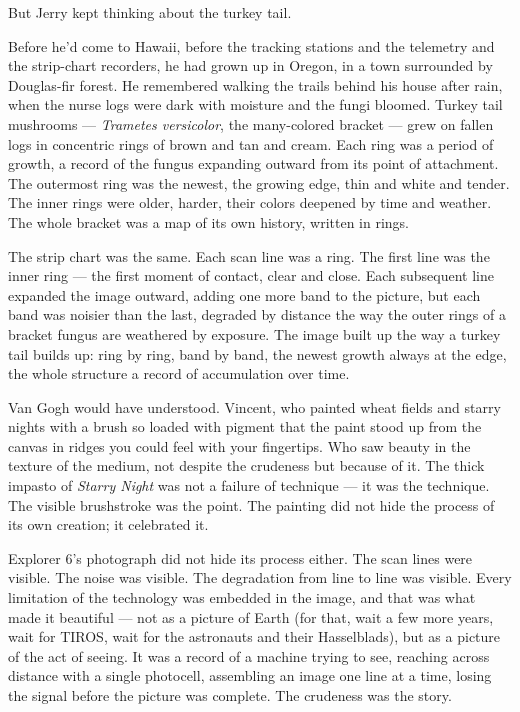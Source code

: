 \documentclass[12pt, letterpaper]{article}
\begin{document}
But Jerry kept thinking about the turkey tail.

Before he'd come to Hawaii, before the tracking stations and the telemetry and the strip-chart recorders, he had grown up in Oregon, in a town surrounded by Douglas-fir forest. He remembered walking the trails behind his house after rain, when the nurse logs were dark with moisture and the fungi bloomed. Turkey tail mushrooms --- \textit{Trametes versicolor}, the many-colored bracket --- grew on fallen logs in concentric rings of brown and tan and cream. Each ring was a period of growth, a record of the fungus expanding outward from its point of attachment. The outermost ring was the newest, the growing edge, thin and white and tender. The inner rings were older, harder, their colors deepened by time and weather. The whole bracket was a map of its own history, written in rings.

The strip chart was the same. Each scan line was a ring. The first line was the inner ring --- the first moment of contact, clear and close. Each subsequent line expanded the image outward, adding one more band to the picture, but each band was noisier than the last, degraded by distance the way the outer rings of a bracket fungus are weathered by exposure. The image built up the way a turkey tail builds up: ring by ring, band by band, the newest growth always at the edge, the whole structure a record of accumulation over time.

Van Gogh would have understood. Vincent, who painted wheat fields and starry nights with a brush so loaded with pigment that the paint stood up from the canvas in ridges you could feel with your fingertips. Who saw beauty in the texture of the medium, not despite the crudeness but because of it. The thick impasto of \textit{Starry Night} was not a failure of technique --- it was the technique. The visible brushstroke was the point. The painting did not hide the process of its own creation; it celebrated it.

Explorer 6's photograph did not hide its process either. The scan lines were visible. The noise was visible. The degradation from line to line was visible. Every limitation of the technology was embedded in the image, and that was what made it beautiful --- not as a picture of Earth (for that, wait a few more years, wait for TIROS, wait for the astronauts and their Hasselblads), but as a picture of the act of seeing. It was a record of a machine trying to see, reaching across distance with a single photocell, assembling an image one line at a time, losing the signal before the picture was complete. The crudeness was the story.
\end{document}
